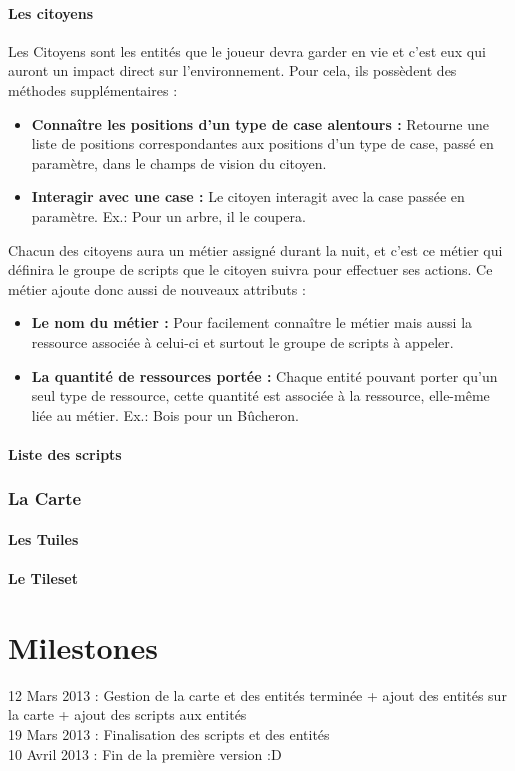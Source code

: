\documentclass[a4paper]{article}
\newcommand{\alinea}{\hspace*{0.5cm}}
\begin{document}
      \subsection{Les citoyens}
        \alinea Les Citoyens sont les entités que le joueur devra garder en vie et c'est eux qui auront un impact direct sur l'environnement.
        Pour cela, ils possèdent des méthodes supplémentaires :
        \begin{itemize}
          \item \textbf{Connaître les positions d'un type de case alentours : } Retourne une liste de positions correspondantes aux positions d'un type de case, passé en paramètre, dans le champs de vision du citoyen.
          \item \textbf{Interagir avec une case : } Le citoyen interagit avec la case passée en paramètre. Ex.: Pour un arbre, il le coupera.
        \end{itemize}
        \alinea Chacun des citoyens aura un métier assigné durant la nuit, et c'est ce métier qui définira le groupe de scripts que le citoyen suivra pour effectuer ses actions. Ce métier ajoute donc aussi de nouveaux attributs :
        \begin{itemize}
          \item \textbf{Le nom du métier : } Pour facilement connaître le métier mais aussi la ressource associée à celui-ci et surtout le groupe de scripts à appeler.
          \item \textbf{La quantité de ressources portée : } Chaque entité pouvant porter qu'un seul type de ressource, cette quantité est associée à la ressource, elle-même liée au métier. Ex.: Bois pour un Bûcheron.
        \end{itemize}
        
      \subsection{Liste des scripts}
      
    \section{La Carte}
      \subsection{Les Tuiles}
      
      \subsection{Le Tileset}
      
      
\newpage
  \part{Milestones}
    12 Mars 2013 : Gestion de la carte et des entités terminée + ajout des entités sur la carte + ajout des scripts aux entités\\
    19 Mars 2013 : Finalisation des scripts et des entités\\
    10 Avril 2013 : Fin de la première version :D\\
\end{document}
